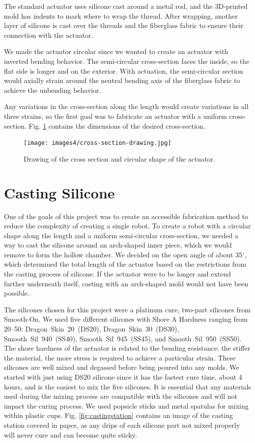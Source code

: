 The standard actuator uses silicone cast around a metal rod, and the 3D-printed mold has indents to mark where to wrap the thread. After wrapping, another layer of silicone is cast over the threads and the fiberglass fabric to ensure their connection with the actuator. 

We made the actuator circular since we wanted to create an actuator with inverted bending behavior. The semi-circular cross-section faces the inside, so the flat side is longer and on the exterior. With actuation, the semi-circular section would axially strain around the neutral bending axis of the fiberglass fabric to achieve the unbending behavior. 

Any variations in the cross-section along the length would create variations in all three strains, so the first goal was to fabricate an actuator with a uniform cross-section. Fig. \ref{fig:crosssection} contains the dimensions of the desired cross-section.

\begin{figure}[ht]
    \centering
    \texttt{[image: images4/cross-section-drawing.jpg]}
    \caption{Drawing of the cross section and circular shape of the actuator.}
    \label{fig:crosssection}
\end{figure}

\section{Casting Silicone}
One of the goals of this project was to create an accessible fabrication method to reduce the complexity of creating a single robot. To create a robot with a circular shape along the length and a uniform semi-circular cross-section, we needed a way to cast the silicone around an arch-shaped inner piece, which we would remove to form the hollow chamber. We decided on the open angle of about 35$^\circ$, which determined the total length of the actuator based on the restrictions from the casting process of silicone. If the actuator were to be longer and extend further underneath itself, casting with an arch-shaped mold would not have been possible. 

The silicones chosen for this project were a platinum cure, two-part silicones from Smooth-On. We used five different silicones with Shore A Hardness ranging from 20--50: Dragon~Skin~20~(DS20), Dragon~Skin~30~(DS30), Smooth~Sil~940~(SS40), Smooth~Sil~945~(SS45), and Smooth~Sil~950~(SS50). The shore hardness of the actuator is related to the bending resistance: the stiffer the material, the more stress is required to achieve a particular strain. These silicones are well mixed and degassed before being poured into any molds. We started with just using DS20 silicone since it has the fastest cure time, about 4 hours, and is the easiest to mix the five silicones. It is essential that any materials used during the mixing process are compatible with the silicones and will not impact the curing process. We used popsicle sticks and metal spatulas for mixing within plastic cups. Fig. \ref{fig:castingstation} contains an image of the casting station covered in paper, as any drips of each silicone part not mixed properly will never cure and can become quite sticky. 

